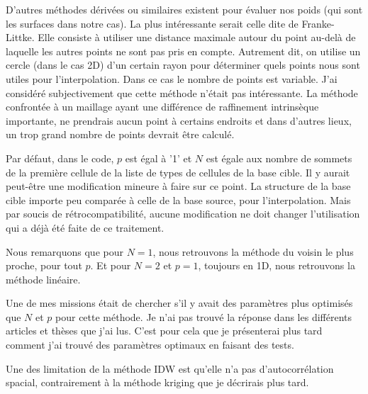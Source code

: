 D'autres méthodes dérivées ou similaires existent pour évaluer nos poids (qui sont les surfaces dans notre cas). La plus intéressante serait celle dite de Franke-Littke. Elle consiste à utiliser une distance maximale autour du point au-delà de laquelle les autres points ne sont pas pris en compte. Autrement dit, on utilise un cercle (dans le cas 2D) d'un certain rayon pour déterminer quels points nous sont utiles pour l'interpolation. Dans ce cas le nombre de points est variable.
J'ai considéré subjectivement que cette méthode n'était pas intéressante. La méthode confrontée à un maillage ayant une différence de raffinement intrinsèque importante, ne prendrais aucun point à certains endroits et dans d'autres lieux, un trop grand nombre de points devrait être calculé.

Par défaut, dans le code, \(p\) est égal à '1' et \(N\) est égale aux nombre de sommets de la première cellule de la liste de types de cellules de la base cible. Il y aurait peut-être une modification mineure à faire sur ce point. La structure de la base cible importe peu comparée à celle de la base source, pour l'interpolation. Mais par soucis de rétrocompatibilité, aucune modification ne doit changer l'utilisation qui a déjà été faite de ce traitement. %

Nous remarquons que pour \( N = 1 \), nous retrouvons la méthode du voisin le plus proche, pour tout \( p \).
Et pour \( N = 2 \) et \( p = 1 \), toujours en 1D, nous retrouvons la méthode linéaire.

Une de mes missions était de chercher s'il y avait des paramètres plus optimisés que \(N\) et \(p\) pour cette méthode. Je n'ai pas trouvé la réponse dans les différents articles\cite{idw-arcgis} et thèses que j'ai lus. C'est pour cela que je présenterai plus tard comment j'ai trouvé des paramètres optimaux en faisant des tests.

Une des limitation\cite{idw-mapscaping} de la méthode IDW est qu'elle n'a pas d'autocorrélation spacial, contrairement à la méthode kriging que je décrirais plus tard.

\vspace{0,5 cm}


